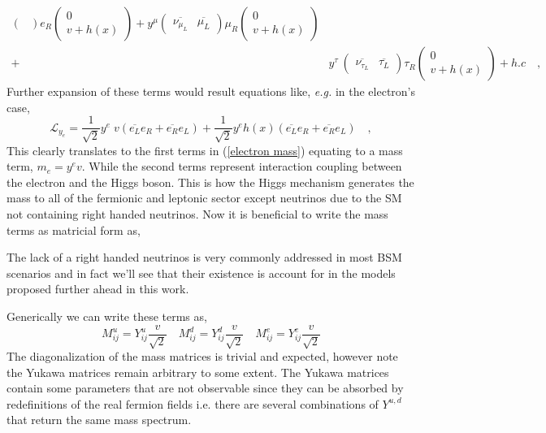 {\begin{align}
\begin{pmatrix}
\end{pmatrix} e_R 
\begin{pmatrix}
0 \\ v + h(x)
\end{pmatrix} +
 y^\mu 
\begin{pmatrix}
\overline{\nu_{\mu_L}} & \overline{\mu_L} 
\end{pmatrix} \mu_R
\begin{pmatrix}
0 \\ v + h(x)
\end{pmatrix} \nonumber  \\  + & 
 y^\tau \
\begin{pmatrix}
\overline{\nu_{\tau_L}} & \overline{\tau_L} 
\end{pmatrix} \tau_R 
\begin{pmatrix}
0 \\ v + h(x)
\end{pmatrix} +  h.c  \nonumber \quad , 
\end{align}
}
%
Further expansion of these terms would result equations like, \textit{e.g.} in the electron's case,  
%
\begin{equation}
\mathcal{L}_{y_e} = \frac{1}{\sqrt{2}} y^e \; v \left( \overline{e_L} e_R + \overline{e_R} e_L \right) + \frac{1}{\sqrt{2}} y^e h(x) \left( \overline{e_L} e_R + \overline{e_R} e_L \right) \quad , 
\label{electron mass}
\end{equation}
%
This clearly translates to the first terms in (\ref{electron mass}) equating to a mass term, $m_e = y^e v $. While the second terms represent interaction coupling between the electron and the Higgs boson.  
%
This is how the Higgs mechanism generates the mass to all of the fermionic and leptonic sector except neutrinos due to the SM not containing right handed neutrinos. Now it is beneficial to write the mass terms as matricial form as,

The lack of a right handed neutrinos is very commonly addressed in most BSM scenarios and in fact we'll see that their existence is account for in the models proposed further ahead in this work. 

Generically we can write these terms as,
\begin{equation}
M^u_{ij} = Y^u_{ij} \frac{v}{\sqrt{2}} \quad M^d_{ij} = Y^d_{ij} \frac{v}{\sqrt{2}} \quad M^e_{ij} = Y^e_{ij} \frac{v}{\sqrt{2}}
\end{equation}
The diagonalization of the mass matrices is trivial and expected, however note the Yukawa matrices remain arbitrary to some extent. The Yukawa matrices contain some parameters that are not observable since they can be absorbed by redefinitions of the real fermion fields i.e. there are several combinations of $Y^{u,d}$ that return the same mass spectrum. 

